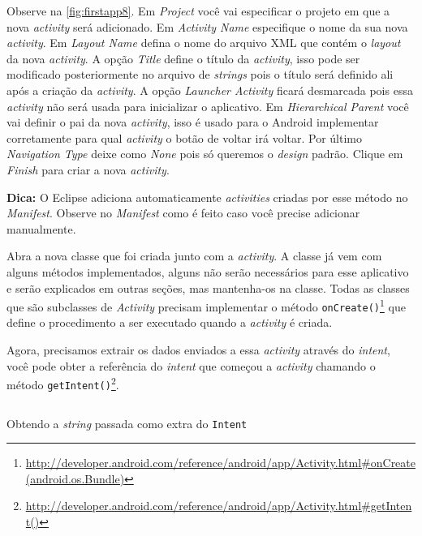 \documentclass[a4paper,12pt,brazil,oneside]{book}
\begin{document}
\begin{singlespace}
Observe na \autoref{fig:firstapp8}. Em \emph{Project} você vai especificar o projeto em que a nova \emph{activity} será adicionado. Em \emph{Activity Name} especifique o nome da sua nova \emph{activity}. Em \emph{Layout Name} defina o nome do arquivo XML que contém o \emph{layout} da nova \emph{activity}. A opção \emph{Title} define o título da \emph{activity}, isso pode ser modificado posteriormente no arquivo de \emph{strings} pois o título será definido ali após a criação da \emph{activity}. A opção \emph{Launcher Activity} ficará desmarcada pois essa \emph{activity} não será usada para inicializar o aplicativo. Em \emph{Hierarchical Parent} você vai definir o pai da nova \emph{activity}, isso é usado para o Android implementar corretamente para qual \emph{activity} o botão de voltar irá voltar. Por último \emph{Navigation Type} deixe como \emph{None} pois só queremos o \emph{design} padrão. Clique em \emph{Finish} para criar a nova \emph{activity}.
 
\begin{framed}
\textbf{Dica:} O Eclipse adiciona automaticamente \emph{activities} criadas por esse método no \emph{Manifest}. Observe no \emph{Manifest} como é feito caso você precise adicionar manualmente.
\end{framed}


Abra a nova classe que foi criada junto com a \emph{activity}. A classe já vem com alguns métodos implementados, alguns não serão necessários para esse aplicativo e serão explicados em outras seções, mas mantenha-os na classe. Todas as classes que são subclasses de \emph{Activity} precisam implementar o método \texttt{onCreate()}\footnote{\href{http://developer.android.com/reference/android/app/Activity.html\#onCreate(android.os.Bundle)}{http://developer.android.com/reference/android/app/Activity.html\#onCreate(android.os.Bundle)}} que define o procedimento a ser executado quando a \emph{activity} é criada.

Agora, precisamos extrair os dados enviados a essa \emph{activity} através do \emph{intent}, você pode obter a referência do \emph{intent} que começou a \emph{activity} chamando o método \texttt{getIntent()}\footnote{\href{http://developer.android.com/reference/android/app/Activity.html\#getIntent()}{http://developer.android.com/reference/android/app/Activity.html\#getIntent()}}.

\begin{listing}[H]
\inputminted[linenos=true,fontsize=\small,frame=lines, framesep=2mm, tabsize=2,numbersep=5pt]{java}{src/firstapp/8.java}
\caption{Obtendo a \emph{string} passada como extra do \texttt{Intent}}
\label{code:obtendo-string-intent}
\end{listing}


\end{singlespace}
\end{document}
